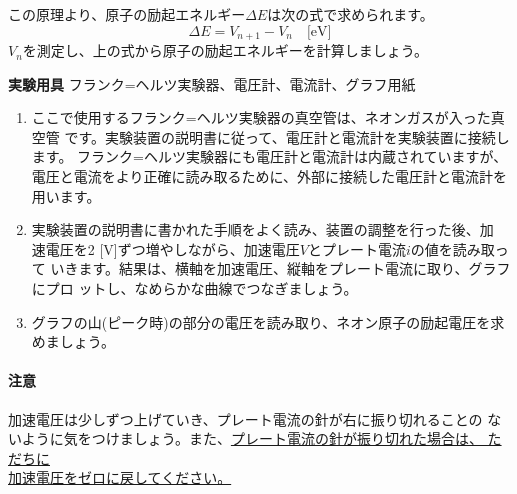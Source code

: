 この原理より、原子の励起エネルギー$\Delta E$は次の式で求められます。
\[
\Delta E = V_{n+1}-V_n \quad \text{[eV]}
\]
$V_n$を測定し、上の式から原子の励起エネルギーを計算しましょう。


\newpage

\jikken

\begin{itemsquarebox}[c]{\bf 実験用具}
フランク=ヘルツ実験器、電圧計、電流計、グラフ用紙
\end{itemsquarebox}

\bigskip


\begin{enumerate}

\item ここで使用するフランク=ヘルツ実験器の真空管は、ネオンガスが入った真空管
です。実験装置の説明書に従って、電圧計と電流計を実験装置に接続します。
フランク=ヘルツ実験器にも電圧計と電流計は内蔵されていますが、
電圧と電流をより正確に読み取るために、外部に接続した電圧計と電流計を用います。

\item 実験装置の説明書に書かれた手順をよく読み、装置の調整を行った後、加
速電圧を2 [V]ずつ増やしながら、加速電圧$V$とプレート電流$i$の値を読み取って
いきます。結果は、横軸を加速電圧、縦軸をプレート電流に取り、グラフにプロ
ットし、なめらかな曲線でつなぎましょう。

\item グラフの山(ピーク時)の部分の電圧を読み取り、ネオン原子の励起電圧を求めましょう。



\end{enumerate}

\paragraph{注意}
加速電圧は少しずつ上げていき、プレート電流の針が右に振り切れることの 
ないように気をつけましょう。また、\underline{プレート電流の針が振り切れた場合は、 
ただちに}\\\underline{加速電圧をゼロに戻してください。}


